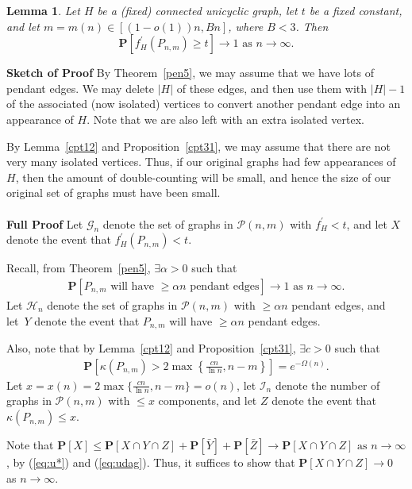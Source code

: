 \documentclass{article}
\newtheorem{Lemma}[Theorem]{Lemma}
\newtheorem{Proof of Theorem}{Proof of Theorem}
\begin{document}
\begin{Lemma} \label{unisub1}
Let $H$ be a (fixed) connected unicyclic graph,
let $t$ be a fixed constant,
and let $m=m(n) \in [(1-o(1))n, Bn]$, where $B<3$.
Then
\begin{displaymath}
\mathbf{P}[f^{\prime}_{H}(P_{n,m}) \geq t] \to 1 
\textrm{ as } n \to \infty.
\end{displaymath} 
\end{Lemma}
\textbf{Sketch of Proof}
By Theorem~\ref{pen5},
we may assume that we have lots of pendant edges.
We may delete $|H|$ of these edges,
and then use them with $|H|-1$ of the associated (now isolated) vertices
to convert another pendant edge into an appearance of $H$.
Note that we are also left with an extra isolated vertex.

By Lemma~\ref{cpt12} and Proposition~\ref{cpt31},
we may assume that there are not very many isolated vertices.
Thus, if our original graphs had few appearances of $H$,
then the amount of double-counting will be small,
and hence the size of our original set of graphs must have been small. \\
\\
\textbf{Full Proof}
Let $\mathcal{G}_{n}$ denote the set of graphs in $\mathcal{P}(n,m)$ 
with $f^{\prime}_{H} < t$,
and let $X$ denote the event that $f_{H}^{\prime}(P_{n,m}) < t$.

Recall, from Theorem~\ref{pen5},
$\exists \alpha >0$ such that
\begin{eqnarray}
\mathbf{P}[P_{n,m} 
\textrm{ will have $\geq \alpha n$ pendant edges}] \to 1 
\textrm{ as } n \to \infty. \label{eq:u*}
\end{eqnarray} 
Let $\mathcal{H}_{n}$ denote the set of graphs in $\mathcal{P}(n,m)$
with $\geq \alpha n$ pendant edges,
and let~$Y$ denote the event that $P_{n,m}$ will have $\geq \alpha n$ pendant edges.

Also, note that by Lemma~\ref{cpt12} and Proposition~\ref{cpt31},
$\exists c>0$ such that
\begin{eqnarray}
\mathbf{P} \left[ \kappa \left( P_{n,m} \right)
> 2 \max \left \{ \frac{cn}{\ln n}, n-m \right \} \right] = e^{- \Omega(n)}. \label{eq:udag}
\end{eqnarray} 
Let $x=x(n)= 2 \max \{ \frac{cn}{\ln n}, n-m \} = o(n)$,
let $\mathcal{I}_{n}$ denote the number of graphs in $\mathcal{P}(n,m)$ with $\leq x$ components,
and let $Z$ denote the event that $\kappa \left( P_{n,m} \right) \leq x$.

Note that 
$\mathbf{P}[X] \leq \mathbf{P}[X \cap Y \cap Z] + \mathbf{P} \left[\bar{Y}\right] + \mathbf{P}\left[\bar{Z}\right] 
\to \mathbf{P}[X \cap Y \cap Z] \textrm{ as } n \to \infty$, 
by (\ref{eq:u*}) and (\ref{eq:udag}).
Thus, it suffices to show that $\mathbf{P}[X \cap Y \cap Z] \to 0$ as $n \to \infty$. \\
\end{document}
